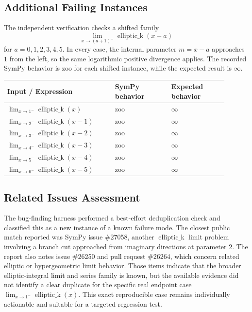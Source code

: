 \documentclass[11pt]{article}
\begin{document}
\subsection{Additional Failing Instances}

The independent verification checks a shifted family
\[
\lim_{x\to (a+1)^-} \operatorname{elliptic\_k}(x-a)
\]
for \(a=0,1,2,3,4,5\). In every case, the internal parameter \(m=x-a\) approaches \(1\) from the left, so the same logarithmic positive divergence applies. The recorded SymPy behavior is \(\mathrm{zoo}\) for each shifted instance, while the expected result is \(\infty\).

\begin{center}
\renewcommand{\arraystretch}{1.3}
\begin{tabular}{@{}>{\raggedright\arraybackslash}p{0.44\linewidth}>{\raggedright\arraybackslash}p{0.23\linewidth}>{\raggedright\arraybackslash}p{0.23\linewidth}@{}}
\toprule
\textbf{Input / Expression} & \textbf{SymPy behavior} & \textbf{Expected behavior} \\
\midrule
\(\displaystyle \lim_{x\to 1^-}\operatorname{elliptic\_k}(x)\) & \(\mathrm{zoo}\) & \(\infty\) \\
\(\displaystyle \lim_{x\to 2^-}\operatorname{elliptic\_k}(x-1)\) & \(\mathrm{zoo}\) & \(\infty\) \\
\(\displaystyle \lim_{x\to 3^-}\operatorname{elliptic\_k}(x-2)\) & \(\mathrm{zoo}\) & \(\infty\) \\
\(\displaystyle \lim_{x\to 4^-}\operatorname{elliptic\_k}(x-3)\) & \(\mathrm{zoo}\) & \(\infty\) \\
\(\displaystyle \lim_{x\to 5^-}\operatorname{elliptic\_k}(x-4)\) & \(\mathrm{zoo}\) & \(\infty\) \\
\(\displaystyle \lim_{x\to 6^-}\operatorname{elliptic\_k}(x-5)\) & \(\mathrm{zoo}\) & \(\infty\) \\
\bottomrule
\end{tabular}
\end{center}

\subsection{Related Issues Assessment}

The bug-finding harness performed a best-effort deduplication check and classified this as a new instance of a known failure mode. The closest public match reported was SymPy issue \#27058, another \(\operatorname{elliptic\_k}\) limit problem involving a branch cut approached from imaginary directions at parameter \(2\). The report also notes issue \#26250 and pull request \#26264, which concern related elliptic or hypergeometric limit behavior. Those items indicate that the broader elliptic-integral limit and series family is known, but the available evidence did not identify a clear duplicate for the specific real endpoint case \(\lim_{x\to1^-}\operatorname{elliptic\_k}(x)\). This exact reproducible case remains individually actionable and suitable for a targeted regression test.
\end{document}
